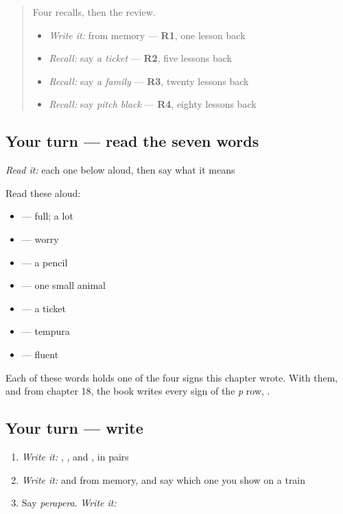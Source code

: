 \begin{quote}
Four recalls, then the review.

\begin{itemize}
\raggedright
  \item \emph{Write it:} \textbf{} from memory — \textbf{R1}, one lesson back
  \item \emph{Recall:} say \emph{a ticket} — \textbf{R2}, five lessons back
  \item \emph{Recall:} say \emph{a family} — \textbf{R3}, twenty lessons back
  \item \emph{Recall:} say \emph{pitch black} — \textbf{R4}, eighty lessons back
\end{itemize}
\end{quote}

\subsection*{Your turn — read the seven words}
\emph{Read it:} each one below aloud, then say what it means

Read these aloud:

\begin{itemize}
\raggedright
  \item \textbf{} — full; a lot
  \item \textbf{} — worry
  \item \textbf{} — a pencil
  \item \textbf{} — one small animal
  \item \textbf{} — a ticket
  \item \textbf{} — tempura
  \item \textbf{} — fluent
\end{itemize}

Each of these words holds one of the four signs this chapter wrote. With them, and \textbf{} from chapter 18, the book writes every sign of the \emph{p} row, \textbf{    }.

\subsection*{Your turn — write}
\begin{enumerate}
\raggedright
  \item \emph{Write it:} \textbf{ }, \textbf{ }, \textbf{ } and \textbf{ }, in pairs
  \item \emph{Write it:} \textbf{} and \textbf{} from memory, and say which one you show on a train
  \item Say \emph{perapera}. \emph{Write it:} \textbf{}
\end{enumerate}

